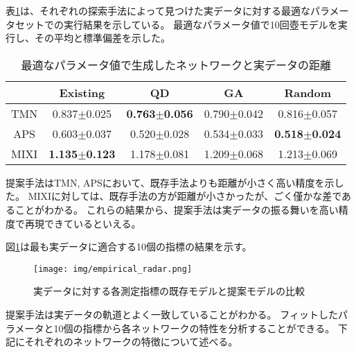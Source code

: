 \documentclass[uplatex,11pt,openany]{ujreport}
\begin{document}
            表\ref{tab:best_distance}は、それぞれの探索手法によって見つけた実データに対する最適なパラメータセットでの実行結果を示している。
            最適なパラメータ値で10回壺モデルを実行し、その平均と標準偏差を示した。
            \begin{table}[H]
                \centering
                \caption{最適なパラメータ値で生成したネットワークと実データの距離}
                \label{tab:best_distance}
                \begin{tabular}{ccccc}
                \hline
                     & Existing & QD & GA & Random \\ \hline
                TMN  & 0.837$\pm$0.025     & \textbf{0.763$\pm$0.056}       & 0.790$\pm$0.042       & 0.816$\pm$0.057   \\
                APS  & 0.603$\pm$0.037     & 0.520$\pm$0.028       & 0.534$\pm$0.033       & \textbf{0.518$\pm$0.024}   \\
                MIXI & \textbf{1.135$\pm$0.123}     & 1.178$\pm$0.081       & 1.209$\pm$0.068       & 1.213$\pm$0.069   \\ \hline
                \end{tabular}
            \end{table}
            提案手法はTMN, APSにおいて、既存手法よりも距離が小さく高い精度を示した。
            MIXIに対しては、既存手法の方が距離が小さかったが、ごく僅かな差であることがわかる。
            これらの結果から、提案手法は実データの振る舞いを高い精度で再現できているといえる。

            図\ref{fig:radar_chart}は最も実データに適合する10個の指標の結果を示す。
            \begin{figure}[H]
                \centering
                \texttt{[image: img/empirical\_radar.png]}
                \caption{実データに対する各測定指標の既存モデルと提案モデルの比較}
                \label{fig:radar_chart}
            \end{figure}
            提案手法は実データの軌道とよく一致していることがわかる。
            フィットしたパラメータと10個の指標から各ネットワークの特性を分析することができる。
            下記にそれぞれのネットワークの特徴について述べる。
\end{document}
